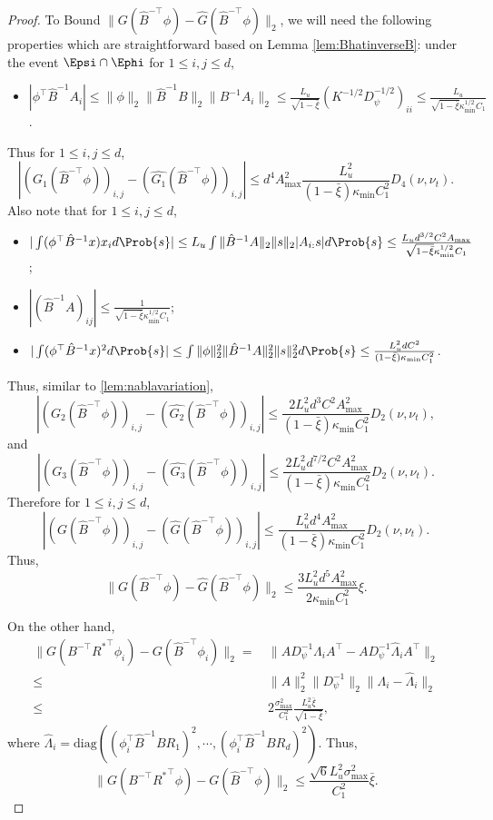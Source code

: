 \begin{proof}
To Bound $\|G(\hat{B}^{-\top}\phi) - \hat{G}(\hat{B}^{-\top}\phi)\|_2$, we will need the following properties which are straightforward based on Lemma \ref{lem:BhatinverseB}: 
under the event $ \Epsi\cap \Ephi $ for $1\le i, j\le d$,
\begin{itemize}
\item $|\phi^{\top}\hat{B}^{-1}A_i| \le \|\phi\|_2\|\hat{B}^{-1}B\|_2\|B^{-1}A_i\|_2\le
 \frac{L_u}{\sqrt{1-\bar{\xi}}} (K^{-1/2}D^{-1/2}_{\psi})_{ii} \le
 \frac{L_u}{\sqrt{1-\bar{\xi}}\kappa_{\min}^{1/2}C_1}$.
\end{itemize}
Thus for $1\le i, j\le d$,
\[
|(G_1(\hat{B}^{-\top}\phi))_{i,j} - (\hat{G_1}(\hat{B}^{-\top}\phi))_{i,j}| \le
d^4A^2_{\max}\frac{L_u^2}{(1-\bar{\xi})\kappa_{\min}C_1^2}D_4(\nu,\nu_t).
\]
Also note that for $1\le i, j\le d$,
\begin{itemize}
\item $|\int(\phi^{\top}\hat{B}^{-1}x)x_i d\Prob{s}| 
\le L_u\int \|\hat{B}^{-1}A\|_2\|s\|_2 |A_{i:}s| d\Prob{s}
\le \frac{L_ud^{3/2}C^2A_{\max}}{\sqrt{1-\bar{\xi}}\kappa_{\min}^{1/2}C_1}$; 
\item $|(\hat{B}^{-1}A)_{ij}| \le \frac{1}{\sqrt{1-\bar{\xi}}\kappa_{\min}^{1/2}C_1}$;
\item $|\int(\phi^{\top}\hat{B}^{-1}x)^2 d\Prob{s}|\le
 \int \|\phi\|_2^2 \|\hat{B}^{-1}A\|_2^2\|s\|_2^2 d\Prob{s} \le \frac{L_u^2dC^2}{(1-\bar{\xi})\kappa_{\min}C_1^2}$.
\end{itemize}
Thus, similar to \ref{lem:nablavariation},
\[
|(G_2(\hat{B}^{-\top}\phi))_{i,j} - (\hat{G_2}(\hat{B}^{-\top}\phi))_{i,j}| \le
\frac{2L_u^2d^3C^2A^2_{\max}}{(1-\bar{\xi})\kappa_{\min}C_1^2}D_2(\nu,\nu_t),
\]
and 
\[
|(G_3(\hat{B}^{-\top}\phi))_{i,j} - (\hat{G_3}(\hat{B}^{-\top}\phi))_{i,j}| \le
\frac{2L_u^2d^{7/2}C^2A^2_{\max}}{(1-\bar{\xi})\kappa_{\min}C_1^2}D_2(\nu,\nu_t).
\]
Therefore for $1\le i,j\le d$,
\[
\left|\left(G(\hat{B}^{-\top}\phi)\right)_{i,j} - \left(\hat{G}(\hat{B}^{-\top}\phi)\right)_{i,j}\right| 
\le
\frac{L_u^2d^4A^2_{\max}}{(1-\bar{\xi})\kappa_{\min}C_1^2}D_2(\nu,\nu_t). 
\]
Thus, 
\begin{equation}
\label{eq:fBhatfhatBhat}
 \|G(\hat{B}^{-\top}\phi) - \hat{G}(\hat{B}^{-\top}\phi)\|_2 \le 
\frac{3L_u^2d^5A^2_{\max}}{2\kappa_{\min}C_1^2}\xi.
\end{equation}

On the other hand, 
\begin{align*}
\|G(B^{-\top}{R^*}^{\top}\phi_i) - G(\hat{B}^{-\top}\phi_i)\|_2 
= & \, \|A D_{\psi}^{-1}\Lambda_iA^{\top}- A D_{\psi}^{-1}\hat{\Lambda}_iA^{\top}\|_2 \\
\le & \, \|A\|^2_2 \|D_{\psi}^{-1}\|_2 \|\Lambda_i - \hat{\Lambda}_i\|_2\\
\le & \, 2\frac{\sigma_{\max}^2}{C_1^2}\frac{L_u^2\bar{\xi}}{\sqrt{1-\bar{\xi}}},
\end{align*}
where $\hat{\Lambda}_i = \text{diag}\left((\phi_i^{\top}\hat{B}^{-1}BR_1)^2, \cdots, (\phi_i^{\top}\hat{B}^{-1}BR_d)^2\right)$.
Thus,
\begin{equation}
\label{eq:fBfBhat}
\|G(B^{-\top}{R^*}^{\top}\phi) - G(\hat{B}^{-\top}\phi)\|_2 \le  \frac{\sqrt{6}L_u^2\sigma_{\max}^2}{C_1^2}\bar{\xi}. 
\end{equation}


\end{proof}
